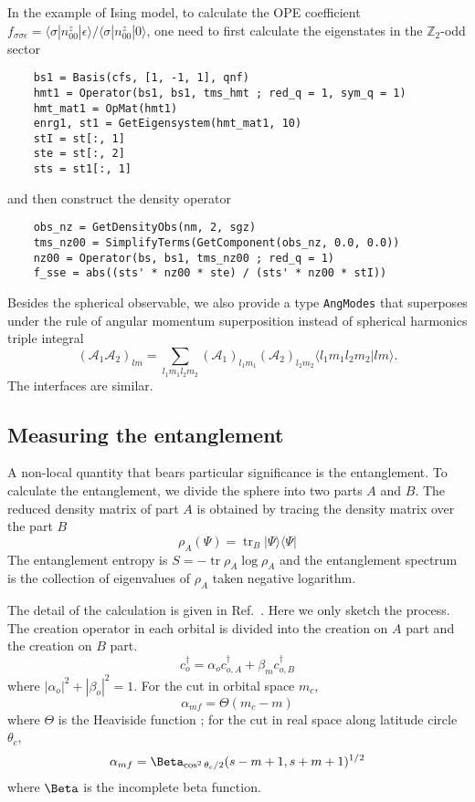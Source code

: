 \documentclass{timesjhep}
\begin{document}
In the example of Ising model, to calculate the OPE coefficient $f_{\sigma\sigma\epsilon}=\langle \sigma|n^z_{00}|\epsilon\rangle/\langle \sigma|n^z_{00}|0\rangle$, one need to first calculate the eigenstates in the $\mathbb{Z}_2$-odd sector
\begin{lstlisting}
    bs1 = Basis(cfs, [1, -1, 1], qnf)
    hmt1 = Operator(bs1, bs1, tms_hmt ; red_q = 1, sym_q = 1) 
    hmt_mat1 = OpMat(hmt1)
    enrg1, st1 = GetEigensystem(hmt_mat1, 10)
    stI = st[:, 1] 
    ste = st[:, 2] 
    sts = st1[:, 1]
\end{lstlisting}
and then construct the density operator
\begin{lstlisting}
    obs_nz = GetDensityObs(nm, 2, sgz)
    tms_nz00 = SimplifyTerms(GetComponent(obs_nz, 0.0, 0.0))
    nz00 = Operator(bs, bs1, tms_nz00 ; red_q = 1) 
    f_sse = abs((sts' * nz00 * ste) / (sts' * nz00 * stI))
\end{lstlisting}

Besides the spherical observable, we also provide a type \lstinline|AngModes| that superposes under the rule of angular momentum superposition instead of spherical harmonics triple integral
\begin{equation}
    (\mathscr{A}_1\mathscr{A}_2)_{lm}=\sum_{l_1m_1l_2m_2}(\mathcal{A}_1)_{l_1m_1}(\mathcal{A}_2)_{l_2m_2}\langle l_1m_1l_2m_2|lm\rangle.
\end{equation}
The interfaces are similar.

\subsection{Measuring the entanglement}
\label{sec:ed_ent}

A non-local quantity that bears particular significance is the entanglement. To calculate the entanglement, we divide the sphere into two parts $A$ and $B$. The reduced density matrix of part $A$ is obtained by tracing the density matrix over the part $B$
\begin{equation}
    \rho_A(\Psi)=\operatorname{tr}_B|\Psi\rangle\langle\Psi|
\end{equation}
The entanglement entropy is $S=-\operatorname{tr}\rho_A\log\rho_A$ and the entanglement spectrum is the collection of eigenvalues of $\rho_A$ taken negative logarithm. 

The detail of the calculation is given in Ref.~\cite{Sterdyniak2011Entanglement}. Here we only sketch the process. The creation operator in each orbital is divided into the creation on $A$ part and the creation on $B$ part. 
\begin{equation}
    c^\dagger_o=\alpha_oc^\dagger_{o,A}+\beta_mc^\dagger_{o,B}
\end{equation}
where $|\alpha_o|^2+|\beta_o|^2=1$. For the cut in orbital space $m_c$, 
\begin{equation*}
    \alpha_{mf}=\Theta(m_c-m)
\end{equation*}
where $\Theta$ is the Heaviside function ; for the cut in real space along latitude circle $\theta_c$,
\begin{equation*}
    \alpha_{mf}=\Beta_{\cos^2\theta_c/2}(s-m+1,s+m+1)^{1/2}
\end{equation*}
where $\Beta$ is the incomplete beta function. 
\end{document}
